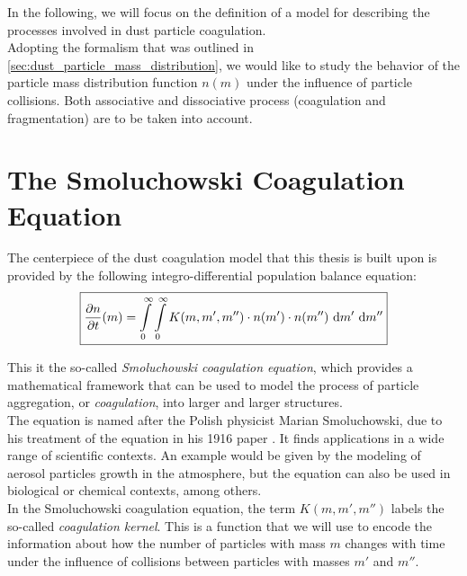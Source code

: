 
In the following, we will focus on the definition of a model for describing the 
processes involved in dust particle coagulation. \\

Adopting the formalism that was outlined in \cref{sec:dust_particle_mass_distribution},
we would like to study the behavior of the particle mass distribution function $n(m)$
under the influence of particle collisions. Both associative and dissociative process 
(coagulation and fragmentation) are to be taken into account.

\section{The Smoluchowski Coagulation Equation}

    The centerpiece of the dust coagulation model that this thesis is built upon is provided 
    by the following integro-differential population balance equation:
    \begin{equation}
        \label{eq:continuous_smoluchowski_equation}
        \boxed{
        \frac{\partial n}{\partial t}(m)
            =
                \int\limits_0^\infty
                \int\limits_0^\infty
                K(m,m',m'')
                \cdot n(m')
                \cdot n(m'')
                \ \text{d} m'
                \ \text{d} m''
        }
    \end{equation}

    This it the so-called \textit{Smoluchowski coagulation equation}, which provides a 
    mathematical framework that can be used to model the process of particle aggregation, 
    or \textit{coagulation}, into larger and larger structures. \\

    The equation is named after the Polish physicist Marian Smoluchowski, due to his treatment 
    of the equation in his 1916 paper \cite{smoluchowski_1916}. 
    It finds applications in a wide range of scientific contexts.
    An example would be given by the modeling of aerosol particles growth in the atmosphere,
    but the equation can also be used in biological or chemical contexts, among others. \\

    In the Smoluchowski coagulation equation, the term $K(m, m', m'')$ labels the so-called
    \textit{coagulation kernel}. 
    This is a function that we will use to encode the information about how the number of 
    particles with mass $m$ changes with time under the influence of collisions between 
    particles with masses $m'$ and $m''$. \\


